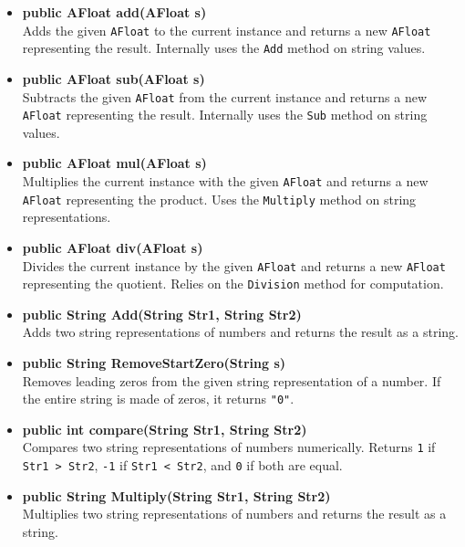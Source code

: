 \documentclass{article}
\begin{document}
\begin{itemize}

\item \textbf{public AFloat add(AFloat s)} \\
Adds the given \texttt{AFloat} to the current instance and returns a new \texttt{AFloat} representing the result. Internally uses the \texttt{Add} method on string values.

\item \textbf{public AFloat sub(AFloat s)} \\
Subtracts the given \texttt{AFloat} from the current instance and returns a new \texttt{AFloat} representing the result. Internally uses the \texttt{Sub} method on string values.

\item \textbf{public AFloat mul(AFloat s)} \\
Multiplies the current instance with the given \texttt{AFloat} and returns a new \texttt{AFloat} representing the product. Uses the \texttt{Multiply} method on string representations.

\item \textbf{public AFloat div(AFloat s)} \\
Divides the current instance by the given \texttt{AFloat} and returns a new \texttt{AFloat} representing the quotient. Relies on the \texttt{Division} method for computation.

\item \textbf{public String Add(String Str1, String Str2)} \\
Adds two string representations of numbers and returns the result as a string.

\item \textbf{public String RemoveStartZero(String s)} \\
Removes leading zeros from the given string representation of a number. If the entire string is made of zeros, it returns \texttt{"0"}.

\item \textbf{public int compare(String Str1, String Str2)} \\
Compares two string representations of numbers numerically. Returns \texttt{1} if \texttt{Str1 > Str2}, \texttt{-1} if \texttt{Str1 < Str2}, and \texttt{0} if both are equal.

\item \textbf{public String Multiply(String Str1, String Str2)} \\
Multiplies two string representations of numbers and returns the result as a string.


\end{itemize}
\end{document}
